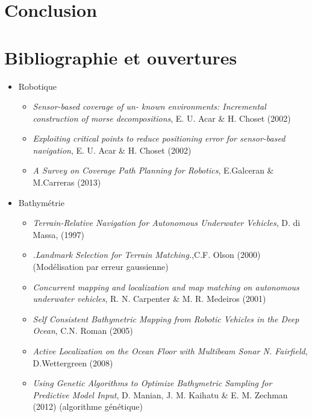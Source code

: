 \documentclass[11pt]{beamer}
\begin{document}
\section{Conclusion}

\section{Bibliographie et ouvertures}
\begin{frame}

\begin{itemize}


\frametitle{Quelques pistes bibliographiques}

\item{Robotique} 
\begin{itemize}
\item \textit{Sensor-based coverage of un-
known environments: Incremental construction of morse
decompositions}, E. U. Acar \& H. Choset (2002)
\item \textit{Exploiting critical points to reduce positioning error
  for sensor-based navigation}, E. U. Acar \& H. Choset (2002)
\item \textit{A Survey on Coverage Path Planning for Robotics},
  E.Galceran \& M.Carreras (2013)
\end{itemize}

\item{Bathymétrie}
\begin{itemize}
\item  \textit{Terrain-Relative Navigation for Autonomous Underwater Vehicles}, D. di Massa, (1997)

\item \textit{.Landmark Selection for Terrain Matching.},C.F. Olson (2000)
(Modélisation par erreur gaussienne)

\item \textit{Concurrent mapping and
localization and map matching on autonomous underwater vehicles}, R. N. Carpenter \& M. R. Medeiros (2001)
\item \textit{Self Consistent Bathymetric Mapping from Robotic Vehicles in the Deep Ocean}, C.N. Roman (2005)
\item \textit{Active Localization on the Ocean Floor with Multibeam Sonar N. Fairfield}, D.Wettergreen (2008)
\item \textit{Using Genetic Algorithms to Optimize Bathymetric Sampling
for Predictive Model Input}, D. Manian, J. M. Kaihatu \& E. M. Zechman (2012) (algorithme génétique)




\end{itemize}
\end{itemize}
\end{frame}
\end{document}
